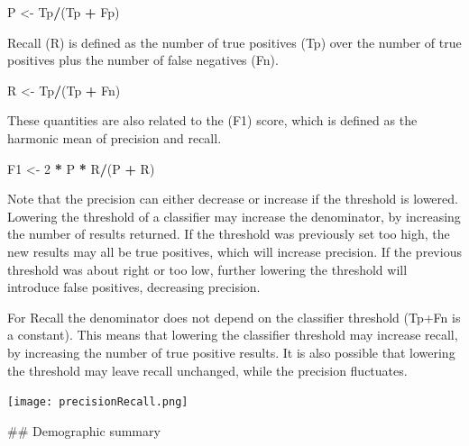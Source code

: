 \documentclass[
]{article}
\newenvironment{Shaded}{\begin{snugshade}}{\end{snugshade}}
\newcommand{\DecValTok}[1]{\textcolor[rgb]{0.00,0.00,0.81}{#1}}
\newcommand{\NormalTok}[1]{#1}
\newcommand{\OperatorTok}[1]{\textcolor[rgb]{0.81,0.36,0.00}{\textbf{#1}}}
\newcommand{\StringTok}[1]{\textcolor[rgb]{0.31,0.60,0.02}{#1}}
\begin{document}
\begin{Shaded}
\begin{Highlighting}[]
\NormalTok{P <-}\StringTok{ }\NormalTok{Tp}\OperatorTok{/}\NormalTok{(Tp }\OperatorTok{+}\StringTok{ }\NormalTok{Fp)}
\end{Highlighting}
\end{Shaded}

Recall (R) is defined as the number of true positives (Tp) over the
number of true positives plus the number of false negatives (Fn).

\begin{Shaded}
\begin{Highlighting}[]
\NormalTok{R <-}\StringTok{ }\NormalTok{Tp}\OperatorTok{/}\NormalTok{(Tp }\OperatorTok{+}\StringTok{ }\NormalTok{Fn)}
\end{Highlighting}
\end{Shaded}

These quantities are also related to the (F1) score, which is defined as
the harmonic mean of precision and recall.

\begin{Shaded}
\begin{Highlighting}[]
\NormalTok{F1 <-}\StringTok{ }\DecValTok{2} \OperatorTok{*}\StringTok{ }\NormalTok{P }\OperatorTok{*}\StringTok{ }\NormalTok{R}\OperatorTok{/}\NormalTok{(P }\OperatorTok{+}\StringTok{ }\NormalTok{R)}
\end{Highlighting}
\end{Shaded}

Note that the precision can either decrease or increase if the threshold
is lowered. Lowering the threshold of a classifier may increase the
denominator, by increasing the number of results returned. If the
threshold was previously set too high, the new results may all be true
positives, which will increase precision. If the previous threshold was
about right or too low, further lowering the threshold will introduce
false positives, decreasing precision.

For Recall the denominator does not depend on the classifier threshold
(Tp+Fn is a constant). This means that lowering the classifier threshold
may increase recall, by increasing the number of true positive results.
It is also possible that lowering the threshold may leave recall
unchanged, while the precision fluctuates.

\texttt{[image: precisionRecall.png]}

\newpage \#\# Demographic summary
\end{document}
